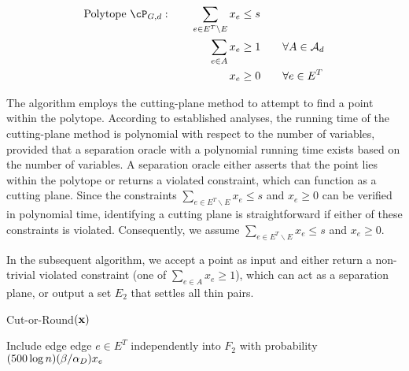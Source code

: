\begin{align*}
	\text{Polytope }\cP_{G,d}: \qquad\sum_{e\in E^T\backslash E}x_e &\le s \\
	\sum_{e\in A}x_e &\ge 1\qquad \forall A\in \mathcal{A}_d\\
	x_e &\geq 0\qquad \forall e\in E^T
\end{align*}

The algorithm employs the cutting-plane method to attempt to find a point within the polytope. According to established analyses, the running time of the cutting-plane method is polynomial with respect to the number of variables, provided that a separation oracle with a polynomial running time exists based on the number of variables. A separation oracle either asserts that the point lies within the polytope or returns a violated constraint, which can function as a cutting plane. Since the constraints $\sum_{e\in E^T\backslash E}x_e\le s$ and $x_e\ge 0$ can be verified in polynomial time, identifying a cutting plane is straightforward if either of these constraints is violated. Consequently, we assume $\sum_{e\in E^T\backslash E}x_e\le s$ and $x_e\ge 0$.

In the subsequent algorithm, we accept a point as input and either return a non-trivial violated constraint (one of $\sum_{e\in A}x_e\ge 1$), which can act as a separation plane, or output a set $E_2$ that settles all thin pairs.




\begin{algorithm}[H]
	
	\caption{{\sc Cut-or-Round}$({\bf x})$}\label{alg:seperationoracle}
	
	Include  edge edge $e\in E^T$ independently into $F_2$ with probability $(500\log n)(\beta/\alpha_D{})x_e$\;
	
\end{algorithm}

